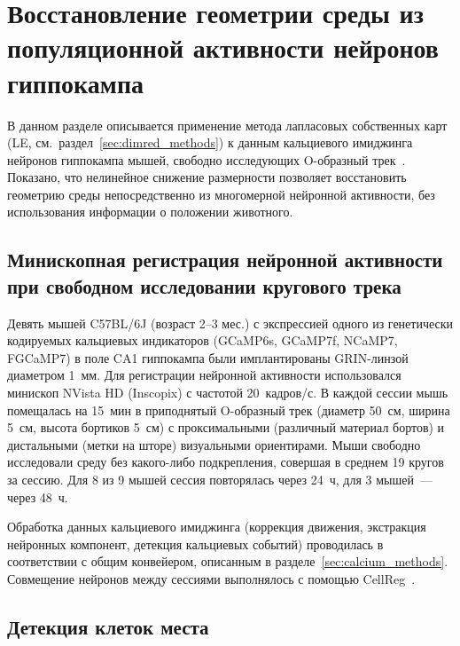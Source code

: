 
\section{Восстановление геометрии среды из популяционной активности нейронов гиппокампа}\label{sec:geometry}

В данном разделе описывается применение метода лапласовых собственных карт (LE, см.\ раздел~\ref{sec:dimred_methods}) к данным кальциевого имиджинга нейронов гиппокампа мышей, свободно исследующих O-образный трек~\cite{Sotskov2022}. Показано, что нелинейное снижение размерности позволяет восстановить геометрию среды непосредственно из многомерной нейронной активности, без использования информации о положении животного.

\subsection{Минископная регистрация нейронной активности при свободном исследовании кругового трека}

Девять мышей C57BL/6J (возраст 2--3 мес.) с экспрессией одного из генетически кодируемых кальциевых индикаторов (GCaMP6s, GCaMP7f, NCaMP7, FGCaMP7) в поле CA1 гиппокампа были имплантированы GRIN-линзой диаметром 1~мм. Для регистрации нейронной активности использовался минископ NVista HD (Inscopix) с частотой 20~кадров/с. В каждой сессии мышь помещалась на 15~мин в приподнятый O-образный трек (диаметр 50~см, ширина 5~см, высота бортиков 5~см) с проксимальными (различный материал бортов) и дистальными (метки на шторе) визуальными ориентирами. Мыши свободно исследовали среду без какого-либо подкрепления, совершая в среднем 19 кругов за сессию. Для 8 из 9 мышей сессия повторялась через 24~ч, для 3 мышей~--- через 48~ч.

Обработка данных кальциевого имиджинга (коррекция движения, экстракция нейронных компонент, детекция кальциевых событий) проводилась в соответствии с общим конвейером, описанным в разделе~\ref{sec:calcium_methods}. Совмещение нейронов между сессиями выполнялось с помощью CellReg~\cite{Sheintuch2017}.

\subsection{Детекция клеток места}

